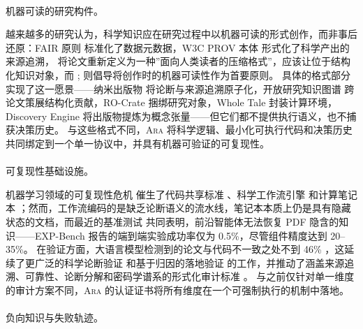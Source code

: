 \documentclass[
]{article}
\makeatletter
\let\oldparagraph\paragraph
\renewcommand{\paragraph}{
    \@ifstar
      \xxxParagraphStar
      \xxxParagraphNoStar
  }
\newcommand{\xxxParagraphStar}[1]{\oldparagraph*{#1}\mbox{}}
\newcommand{\xxxParagraphNoStar}[1]{\oldparagraph{#1}\mbox{}}
\theoremstyle{definition}
\newcommand{\ara}{\textsc{Ara}}
\makeatother
\begin{document}
\paragraph{机器可读的研究构件。}\label{ux673aux5668ux53efux8bfbux7684ux7814ux7a76ux6784ux4ef6}

越来越多的研究认为，科学知识应在研究过程中以机器可读的形式创作，而非事后还原：FAIR
原则 \citep{wilkinson2016fair} 标准化了数据元数据，W3C PROV 本体
\citep{lebo2013provo}
形式化了科学产出的来源追溯，\citet{canini2026stopwriting}
将论文重新定义为一种''面向人类读者的压缩格式''，应该让位于结构化知识对象，而
\citet{stocker2025machinereadable};
\citet{booeshaghi2026machinereadable}
则倡导将创作时的机器可读性作为首要原则。
具体的格式部分实现了这一愿景------纳米出版物 \citep{groth2010nanopub}
将论断与来源追溯原子化，开放研究知识图谱 \citep{jaradeh2019orkg}
跨论文策展结构化贡献，RO-Crate \citep{soilandreyes2022rocrate}
捆绑研究对象，Whole Tale \citep{brinckman2019wholetale}
封装计算环境，Discovery Engine \citep{baulin2025discoveryengine}
将出版物提炼为概念张量------但它们都不提供执行语义，也不捕获决策历史。
与这些格式不同，\ara{}
将科学逻辑、最小化可执行代码和决策历史共同绑定到一个单一协议中，并具有机器可验证的可复现性。

\paragraph{可复现性基础设施。}\label{ux53efux590dux73b0ux6027ux57faux7840ux8bbeux65bd}

机器学习领域的可复现性危机
\citep{baker2016reproducibility, pineau2021reproducibility}
催生了代码共享标准 \citep{stodden2016enhancing}、科学工作流引擎
\citep{koster2012snakemake, ditommaso2017nextflow, crusoe2022cwl}
和计算笔记本
\citep{knuth1984literate, rule2018exploration}；然而，工作流编码的是缺乏论断语义的流水线，笔记本本质上仍是具有隐藏状态的文档，而最近的基准测试
\citep{starace2025paperbench, liu2026scireasoning, kon2025expbench}
共同表明，前沿智能体无法恢复 PDF 隐含的知识------EXP-Bench
报告的端到端实验成功率仅为 0.5\%，尽管组件精度达到 20--35\%。
在验证方面，大语言模型检测到的论文与代码不一致之处不到 46\%
\citep{baumgartner2026scicoqa}，这延续了更广泛的科学论断验证
\citep{wadden2020scifact} 和基于归因的落地验证 \citep{gao2023rarr}
的工作，并推动了涵盖来源追溯、可靠性、论断分解和密码学谱系的形式化审计标准
\citep{rasheed2026aar, huang2025decmetrics, radanliev2026aibom}。
与之前仅针对单一维度的审计方案不同，\ara{}
的认证证书将所有维度在一个可强制执行的机制中落地。

\paragraph{负向知识与失败轨迹。}\label{ux8d1fux5411ux77e5ux8bc6ux4e0eux5931ux8d25ux8f68ux8ff9}
\end{document}
